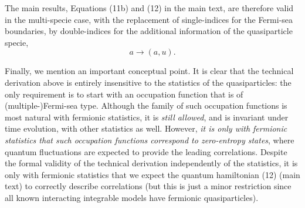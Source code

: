 \documentclass[twocolumn,amsfonts,showpacs,superscriptaddress]{revtex4-1}
\begin{document}
\begin{widetext}
The main results, Equations (11b) and (12) in the main text, are therefore valid in the multi-specie case, with the replacement of single-indices for the Fermi-sea boundaries, by double-indices for the additional information of the quasiparticle specie,
\begin{equation}
	a \longrightarrow (a,u).
\end{equation}

Finally, we mention an important conceptual point. It is clear that the technical derivation above is entirely insensitive to the statistics of the quasiparticles: the only requirement is to start with an occupation function that is of (multiple-)Fermi-sea type. Although the family of such occupation functions is most natural with fermionic statistics, it is {\em still allowed}, and is invariant under time evolution, with other statistics as well. However, {\em it is only with fermionic statistics that such occupation functions correspond to zero-entropy states}, where quantum fluctuations are expected to provide the leading correlations. Despite the formal validity of the technical derivation independently of the statistics, it is only with fermionic statistics that we expect the quantum hamiltonian (12) (main text) to correctly describe correlations (but this is just a minor restriction since all known interacting integrable models have fermionic quasiparticles).





%


\end{widetext}
\end{document}
